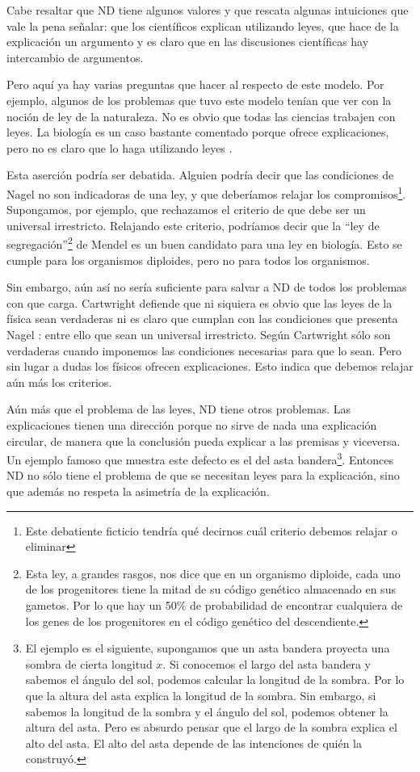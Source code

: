 Cabe resaltar que ND tiene algunos valores y que rescata algunas intuiciones que vale la pena señalar: que los científicos explican utilizando leyes, que hace de la explicación un argumento y es claro que en las discusiones científicas hay intercambio de argumentos.

Pero aquí ya hay varias preguntas que hacer al respecto de este modelo. Por ejemplo, algunos de los problemas que tuvo este modelo tenían que ver con la noción de ley de la naturaleza. No es obvio que todas las ciencias trabajen con leyes. La biología es un caso bastante comentado porque ofrece explicaciones, pero no es claro que lo haga utilizando leyes \cite{Brandon1997}.

Esta aserción podría ser debatida. Alguien podría decir que las condiciones de Nagel no son indicadoras de una ley, y que deberíamos relajar los compromisos\footnote{Este debatiente ficticio tendría qué decirnos cuál criterio debemos relajar o eliminar}. Supongamos, por ejemplo, que rechazamos el criterio de que debe ser un universal irrestricto. Relajando este criterio, podríamos decir que la ``ley de segregación''\footnote{Esta ley, a grandes rasgos, nos dice que en un organismo diploide, cada uno de los progenitores tiene la mitad de su código genético almacenado en sus gametos. Por lo que hay un 50\% de probabilidad de encontrar cualquiera de los genes de los progenitores en el código genético del descendiente.} de Mendel es un buen candidato para una ley en biología. Esto se cumple para los organismos diploides, pero no para todos los organismos.

Sin embargo, aún así no sería suficiente para salvar a ND de todos los problemas con que carga. Cartwright defiende que ni siquiera es obvio que las leyes de la física sean verdaderas ni es claro que cumplan con las condiciones que presenta Nagel \cite{Cartwright1983}: entre ello que sean un universal irrestricto. Según Cartwright sólo son verdaderas cuando imponemos las condiciones necesarias para que lo sean. Pero sin lugar a dudas los físicos ofrecen explicaciones. Esto indica que debemos relajar aún más los criterios.

Aún más que el problema de las leyes, ND tiene otros problemas. Las explicaciones tienen una dirección porque no sirve de nada una explicación circular, de manera que la conclusión pueda explicar a las premisas y viceversa. Un ejemplo famoso que muestra este defecto es el del asta bandera\footnote{El ejemplo es el siguiente, supongamos que un asta bandera proyecta una sombra de cierta longitud $x$. Si conocemos el largo del asta bandera y sabemos el ángulo del sol, podemos calcular la longitud de la sombra. Por lo que la altura del asta explica la longitud de la sombra. Sin embargo, si sabemos la longitud de la sombra y el ángulo del sol, podemos obtener la altura del asta. Pero es absurdo pensar que el largo de la sombra explica el alto del asta. El alto del asta depende de las intenciones de quién la construyó.}. Entonces ND no sólo tiene el problema de que se necesitan leyes para la explicación, sino que además no respeta la asimetría de la explicación.

